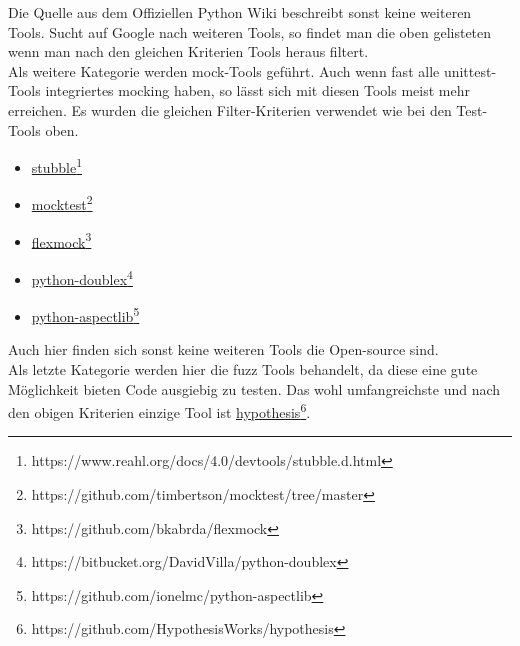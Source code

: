 Die Quelle aus dem Offiziellen Python Wiki beschreibt sonst keine weiteren Tools.
Sucht auf Google nach weiteren Tools, so findet man die oben gelisteten wenn man
nach den gleichen Kriterien Tools heraus filtert.
\newline
\\
Als weitere Kategorie werden \Gls{mock}-Tools geführt. Auch wenn fast alle
unittest-Tools integriertes \gls{mock}ing haben, so lässt sich mit diesen
Tools meist mehr erreichen. Es wurden die gleichen Filter-Kriterien verwendet wie bei den
Test-Tools oben.
\begin{itemize}
    \item \href{https://www.reahl.org/docs/4.0/devtools/stubble.d.html}{stubble}\footnote{https://www.reahl.org/docs/4.0/devtools/stubble.d.html}
    \item \href{https://github.com/timbertson/mocktest/tree/master}{mocktest}\footnote{https://github.com/timbertson/mocktest/tree/master}
    \item \href{https://github.com/bkabrda/flexmock}{flexmock}\footnote{https://github.com/bkabrda/flexmock}
    \item \href{https://bitbucket.org/DavidVilla/python-doublex}{python-doublex}\footnote{https://bitbucket.org/DavidVilla/python-doublex}
    \item \href{https://github.com/ionelmc/python-aspectlib}{python-aspectlib}\footnote{https://github.com/ionelmc/python-aspectlib}
\end{itemize}
Auch hier finden sich sonst keine weiteren Tools die Open-source sind.
\newline
\\
Als letzte Kategorie werden hier die \Gls{fuzz} Tools behandelt, da diese eine
gute Möglichkeit bieten Code ausgiebig zu testen. Das wohl umfangreichste und nach den obigen Kriterien
einzige Tool ist \href{https://github.com/HypothesisWorks/hypothesis}{hypothesis}\footnote{https://github.com/HypothesisWorks/hypothesis}.





